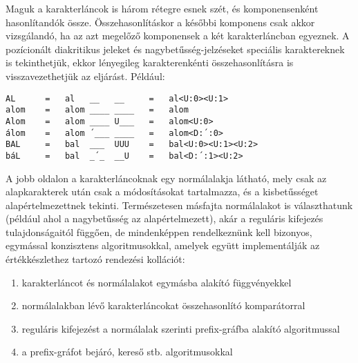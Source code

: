 \documentclass[
    parspace,
    noindent,
    nohyp,
]{elteiktdk}[2023/04/10]
\begin{document}
Maguk a karakterláncok is három rétegre esnek szét, és komponensenként hasonlítandók össze.
Összehasonlításkor a későbbi komponens csak akkor vizsgálandó,
ha az azt megelőző komponensek a két karakterláncban egyeznek.
A pozícionált diakritikus jeleket és nagybetűsség-jelzéseket speciális karaktereknek is tekinthetjük,
ekkor lényegileg karakterenkénti összehasonlításra is visszavezethetjük az eljárást.
Például:

\begin{verbatim}
AL      =   al   __   __     =   al<U:0><U:1>
alom    =   alom ____ ____   =   alom
Alom    =   alom ____ U___   =   alom<U:0>
álom    =   alom ´___ ____   =   alom<D:´:0>
BAL     =   bal  ___  UUU    =   bal<U:0><U:1><U:2>
báL     =   bal  _´_  __U    =   bal<D:´:1><U:2>
\end{verbatim}

A jobb oldalon a karakterláncoknak egy normálalakja látható,
mely csak az alapkarakterek után csak a módosításokat tartalmazza,
és a kisbetűsséget alapértelmezettnek tekinti.
Természetesen másfajta normálalakot is választhatunk (például ahol a nagybetűsség az alapértelmezett),
akár a reguláris kifejezés tulajdonságaitól függően,
de mindenképpen rendelkeznünk kell bizonyos, egymással konzisztens algoritmusokkal,
amelyek együtt implementálják az értékkészlethez tartozó rendezési kollációt:

\begin{enumerate}
    \item karakterláncot és normálalakot egymásba alakító függvényekkel
    \item normálalakban lévő karakterláncokat összehasonlító komparátorral
    \item reguláris kifejezést a normálalak szerinti prefix-gráfba alakító algoritmussal
    \item a prefix-gráfot bejáró, kereső stb. algoritmusokkal
\end{enumerate}

\end{document}
